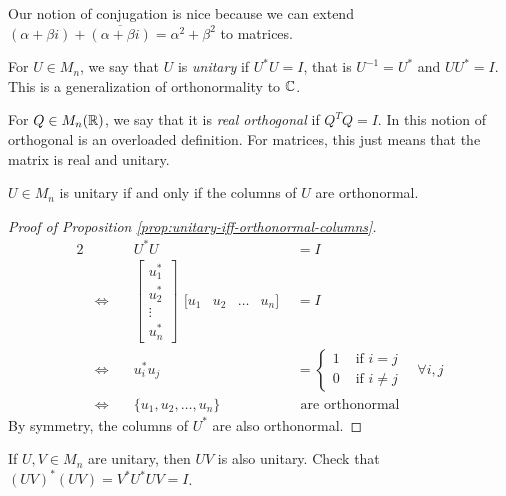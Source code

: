 \noindent Our notion of conjugation is nice because we can extend $(\alpha + \beta i ) + \overline{(\alpha + \beta i)} = \alpha^2 + \beta^2$ to matrices.

\begin{definition}[Unitary]
\label{def:unitary}
For $U \in M_n$, we say that $U$ is \textit{unitary} if $U^*U = I$, that is $U^{-1} = U^*$ and $UU^* = I$. This is a generalization of orthonormality to $\mathbb C$.
\end{definition}

\begin{definition}
\label{def:real-orthogonal}
For $Q \in M_n(\mathbb R)$, we say that it is \textit{real orthogonal} if $Q^T Q = I$. In this notion of orthogonal is an overloaded definition. For matrices, this just means that the matrix is real and unitary.
\end{definition}

\begin{proposition}
\label{prop:unitary-iff-orthonormal-columns}
$U \in M_n$ is unitary if and only if the columns of $U$ are orthonormal.
\end{proposition}

\begin{proof}[Proof of Proposition \ref{prop:unitary-iff-orthonormal-columns}]
\begin{alignat*}{2}
    && U^*U &= I \\
    &\Longleftrightarrow \quad & \begin{bmatrix}u_1^* \\ u_2^* \\ \vdots \\ u_n^*\end{bmatrix} \begin{array}{c|c|c|c}[u_1 & u_2 & \dots & u_n]\end{array} &= I \\
    &\Longleftrightarrow \quad & u_i^* u_j &= \begin{cases}
    1 &\mbox{ if } i = j \\
    0 &\mbox{ if } i \not= j
    \end{cases} \quad \forall i, j \\
    &\Longleftrightarrow \quad & \{u_1, u_2, \dots, u_n\} &\text{ are orthonormal}
\end{alignat*}
By symmetry, the columns of $U^*$ are also orthonormal.
\end{proof}

\begin{note*}
If $U, V \in M_n$ are unitary, then $UV$ is also unitary. Check that $(UV)^*(UV) = V^*U^*UV = I$.
\end{note*}


